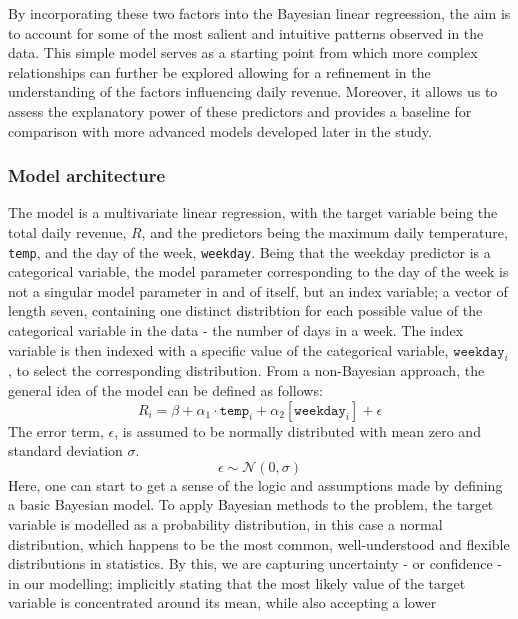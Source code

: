 By incorporating these two factors into the Bayesian linear regreession, the
aim is to account for some of the most salient and intuitive patterns observed
in the data. This simple model serves as a starting point from which more
complex relationships can further be explored allowing for a refinement in the
understanding of the factors influencing daily revenue. Moreover, it allows us
to assess the explanatory power of these predictors and provides a baseline for
comparison with more advanced models developed later in the study.

\subsubsection{Model architecture}
The model is a multivariate linear regression, with the target variable being the
total daily revenue, $R$, and the predictors being the maximum daily
temperature, \texttt{temp}, and the day of the week, \texttt{weekday}. Being that the weekday
predictor is a categorical variable, the model parameter corresponding to the
day of the week is not a singular model parameter in and of itself, but an
index variable; a vector of length seven, containing one distinct
distribtion for each possible value of the categorical variable in the data - the number of days in a week.
The index variable is then indexed with a specific value of the categorical
variable, $\texttt{weekday}_i$, to select the corresponding distribution. 
From a non-Bayesian approach, the general idea of the model can be defined as follows:
\begin{equation}
  \label{eq:temp_model_standard}
  R_i = \beta + \alpha_1 \cdot \texttt{temp}_i + \alpha_2[\texttt{weekday}_i] + \epsilon
\end{equation}
The error term, $\epsilon$, is assumed to be normally distributed with mean 
zero and standard deviation $\sigma$. 
\begin{equation}
  \label{eq:error}
  \epsilon \sim \mathcal{N}(0, \sigma)
\end{equation}
Here, one can start to get a sense of the logic and assumptions made by
defining a basic Bayesian model. To apply Bayesian methods to the problem, the
target variable is modelled as a probability distribution, in this case a
normal distribution, which happens to be the most common, well-understood and
flexible distributions in statistics. By this, we are capturing uncertainty -
or confidence - in our modelling; implicitly stating that the most likely value
of the target variable is concentrated around its mean, while also accepting a lower
